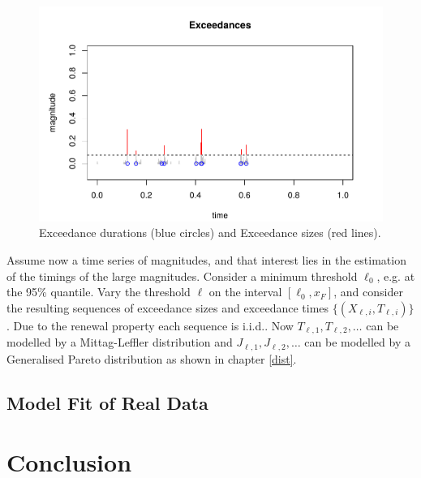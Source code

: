\documentclass[honours,12pt]{UNSWthesis}
\newcommand{\1}{\mathbf 1}
\numberwithin{equation}{section}
\theoremstyle{definition}
\theoremstyle{remark}
\begin{document}
	\begin{figure}[H]
        \centering
        \includegraphics[width=\textwidth]{Figures/Exceedances.png}
        \caption{Exceedance durations (blue circles) and Exceedance sizes (red lines).}
    \end{figure}


Assume now a time series of magnitudes, and that interest lies in the
estimation of the timings of the large magnitudes.
Consider a minimum threshold $\ell_0$, e.g. at the 95\% quantile.
Vary the threshold $\ell$ on the interval $[\ell_0, x_F]$, and consider
the resulting sequences of exceedance sizes and exceedance times 
$\{(X_{\ell,i}, T_{\ell,i})\}$. 
Due to the renewal property each sequence is i.i.d.. Now $T_{\ell,1}, T_{\ell,2}, \ldots$ can be modelled by a Mittag-Leffler distribution and $J_{\ell,1}, J_{\ell,2}, \ldots$ can be modelled by a Generalised Pareto distribution as shown in chapter \ref{dist}.
\section{Model Fit of Real Data}

\chapter{Conclusion}


\clearpage
{}


\end{document}
